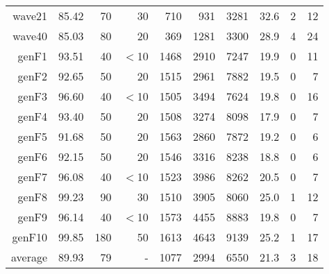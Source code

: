 \begin{table}
\begin{tabular}{|r|r|r|r|r|r|r|r|r|r|}
{\sc wave21} & 85.42 & 70 & 30 & 710 & 931 & 3281 & 32.6 & 2 & 12 \\
{\sc wave40} & 85.03 & 80 & 20 & 369 & 1281 & 3300 & 28.9 & 4 & 24 \\
{\sc genF1} & 93.51 & 40 & $<$10 & 1468 & 2910 & 7247 & 19.9 & 0 & 11 \\
{\sc genF2} & 92.65 & 50 & 20 & 1515 & 2961 & 7882 & 19.5 & 0 & 7 \\
{\sc genF3} & 96.60 & 40 & $<$10 & 1505 & 3494 & 7624 & 19.8 & 0 & 16 \\
{\sc genF4} & 93.40 & 50 & 20 & 1508 & 3274 & 8098 & 17.9 & 0 & 7 \\
{\sc genF5} & 91.68 & 50 & 20 & 1563 & 2860 & 7872 & 19.2 & 0 & 6 \\
{\sc genF6} & 92.15 & 50 & 20 & 1546 & 3316 & 8238 & 18.8 & 0 & 6 \\
{\sc genF7} & 96.08 & 40 & $<$10 & 1523 & 3986 & 8262 & 20.5 & 0 & 7 \\
{\sc genF8} & 99.23 & 90 & 30 & 1510 & 3905 & 8060 & 25.0 & 1 & 12 \\
{\sc genF9} & 96.14 & 40 & $<$10 & 1573 & 4455 & 8883 & 19.8 & 0 & 7 \\
{\sc genF10} & 99.85 & 180 & 50 & 1613 & 4643 & 9139 & 25.2 & 1 & 17 \\
\hline
average & 89.93 & 79 &  -  & 1077 & 2994 & 6550 & 21.3 & 3 & 18 \\
\hline
\end{tabular}
\end{table}
\clearpage
